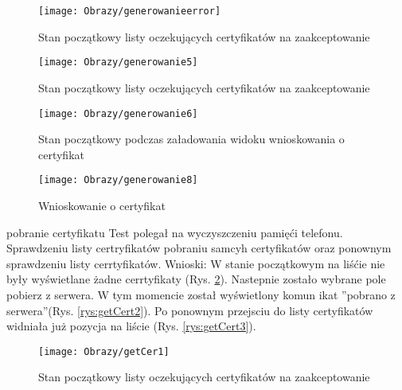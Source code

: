 \begin{enumerate*}
	


	\begin{figure}[ht!]
	
		\begin{minipage}{0.2\textwidth}
		\texttt{[image: Obrazy/generowanieerror]}
		\caption{Stan początkowy listy oczekujących certyfikatów na zaakceptowanie }
		\label{rys:generowanie4}
	\end{minipage}
	
		\begin{minipage}{0.2\textwidth}
		\texttt{[image: Obrazy/generowanie5]}
		\caption{Stan początkowy listy oczekujących certyfikatów na zaakceptowanie }
		\label{rys:generowanie5}
	\end{minipage}
	

	\begin{minipage}{0.2\textwidth}
		\texttt{[image: Obrazy/generowanie6]}
		\caption{Stan początkowy podczas załadowania widoku wnioskowania o certyfikat}
		\label{rys:generowanie6}
	\end{minipage}
	
	\begin{minipage}{0.2\textwidth}
		\texttt{[image: Obrazy/generowanie8]}
		\caption{Wnioskowanie o certyfikat}
		\label{rys:generowanie7}
	\end{minipage}

\end{figure}
	
	
	\item   pobranie certyfikatu
	Test polegał na wyczyszczeniu pamięći telefonu. Sprawdzeniu listy certryfikatów pobraniu samcyh certyfikatów oraz ponownym sprawdzeniu listy cerrtyfikatów.
	Wnioski: W stanie początkowym na liśćie nie były wyświetlane żadne cerrtyfikaty (Rys. \ref{rys:getCert1}). Nastepnie zostało wybrane pole pobierz z serwera. W tym momencie został wyświetlony komun ikat ''pobrano z serwera''(Rys. \ref{rys:getCert2}). Po ponownym przejsciu do listy certyfikatów widniała już pozycja na liście (Rys. \ref{rys:getCert3}).
	
		\begin{figure}[ht!]
		
		\begin{minipage}{0.2\textwidth}
			\texttt{[image: Obrazy/getCer1]}
			\caption{Stan początkowy listy oczekujących certyfikatów na zaakceptowanie }
			\label{rys:getCert1}
		\end{minipage}
		

\end{figure}
\end{enumerate*}
